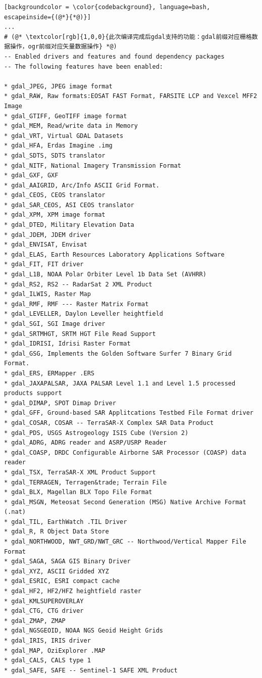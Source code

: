 \begin{lstlisting}[backgroundcolor = \color{codebackground}, language=bash, escapeinside={(@*}{*@)}]
...
# (@* \textcolor[rgb]{1,0,0}{此次编译完成后gdal支持的功能：gdal前缀对应栅格数据操作，ogr前缀对应矢量数据操作} *@)
-- Enabled drivers and features and found dependency packages
-- The following features have been enabled:

* gdal_JPEG, JPEG image format
* gdal_RAW, Raw formats:EOSAT FAST Format, FARSITE LCP and Vexcel MFF2 Image
* gdal_GTIFF, GeoTIFF image format
* gdal_MEM, Read/write data in Memory
* gdal_VRT, Virtual GDAL Datasets
* gdal_HFA, Erdas Imagine .img
* gdal_SDTS, SDTS translator
* gdal_NITF, National Imagery Transmission Format
* gdal_GXF, GXF
* gdal_AAIGRID, Arc/Info ASCII Grid Format.
* gdal_CEOS, CEOS translator
* gdal_SAR_CEOS, ASI CEOS translator
* gdal_XPM, XPM image format
* gdal_DTED, Military Elevation Data
* gdal_JDEM, JDEM driver
* gdal_ENVISAT, Envisat
* gdal_ELAS, Earth Resources Laboratory Applications Software
* gdal_FIT, FIT driver
* gdal_L1B, NOAA Polar Orbiter Level 1b Data Set (AVHRR)
* gdal_RS2, RS2 -- RadarSat 2 XML Product
* gdal_ILWIS, Raster Map
* gdal_RMF, RMF --- Raster Matrix Format
* gdal_LEVELLER, Daylon Leveller heightfield
* gdal_SGI, SGI Image driver
* gdal_SRTMHGT, SRTM HGT File Read Support
* gdal_IDRISI, Idrisi Raster Format
* gdal_GSG, Implements the Golden Software Surfer 7 Binary Grid Format.
* gdal_ERS, ERMapper .ERS
* gdal_JAXAPALSAR, JAXA PALSAR Level 1.1 and Level 1.5 processed products support
* gdal_DIMAP, SPOT Dimap Driver
* gdal_GFF, Ground-based SAR Applitcations Testbed File Format driver
* gdal_COSAR, COSAR -- TerraSAR-X Complex SAR Data Product
* gdal_PDS, USGS Astrogeology ISIS Cube (Version 2)
* gdal_ADRG, ADRG reader and ASRP/USRP Reader
* gdal_COASP, DRDC Configurable Airborne SAR Processor (COASP) data reader
* gdal_TSX, TerraSAR-X XML Product Support
* gdal_TERRAGEN, Terragen&trade; Terrain File
* gdal_BLX, Magellan BLX Topo File Format
* gdal_MSGN, Meteosat Second Generation (MSG) Native Archive Format (.nat)
* gdal_TIL, EarthWatch .TIL Driver
* gdal_R, R Object Data Store
* gdal_NORTHWOOD, NWT_GRD/NWT_GRC -- Northwood/Vertical Mapper File Format
* gdal_SAGA, SAGA GIS Binary Driver
* gdal_XYZ, ASCII Gridded XYZ
* gdal_ESRIC, ESRI compact cache
* gdal_HF2, HF2/HFZ heightfield raster
* gdal_KMLSUPEROVERLAY
* gdal_CTG, CTG driver
* gdal_ZMAP, ZMAP
* gdal_NGSGEOID, NOAA NGS Geoid Height Grids
* gdal_IRIS, IRIS driver
* gdal_MAP, OziExplorer .MAP
* gdal_CALS, CALS type 1
* gdal_SAFE, SAFE -- Sentinel-1 SAFE XML Product

\end{lstlisting}
